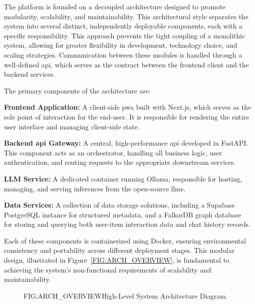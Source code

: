 The platform is founded on a decoupled architecture designed to promote modularity, scalability, and maintainability. This architectural style separates the system into several distinct, independently deployable components, each with a specific responsibility. This approach prevents the tight coupling of a monolithic system, allowing for greater flexibility in development, technology choice, and scaling strategies. Communication between these modules is handled through a well-defined \acs{api}, which serves as the contract between the frontend client and the backend services.

The primary components of the architecture are:
\begin{compactitem}[\textbullet]
    \item \textbf{Frontend Application:} A client-side \ac{pwa} built with Next.js, which serves as the sole point of interaction for the end-user. It is responsible for rendering the entire user interface and managing client-side state.
    \item \textbf{Backend \acs{api} Gateway:} A central, high-performance \acs{api} developed in FastAPI. This component acts as an orchestrator, handling all business logic, user authentication, and routing requests to the appropriate downstream services.
    \item \textbf{LLM Service:} A dedicated container running Ollama, responsible for hosting, managing, and serving inferences from the open-source \acp{llm}.
    \item \textbf{Data Services:} A collection of data storage solutions, including a Supabase PostgreSQL instance for structured metadata, and a FalkorDB graph database for storing and querying both user-item interaction data and chat history records.
\end{compactitem}

Each of these components is containerized using Docker, ensuring environmental consistency and portability across different deployment stages. This modular design, illustrated in Figure~\ref{FIG:ARCH_OVERVIEW}, is fundamental to achieving the system's non-functional requirements of scalability and maintainability.

\begin{figure}[System Architecture Diagram]{FIG:ARCH_OVERVIEW}{High-Level System Architecture Diagram.}
    \centering
    
\end{figure}